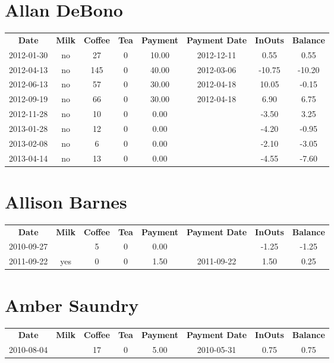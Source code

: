 \section{Allan DeBono}

\begin{center}
\begin{tabular}{cccccccc}
\textbf{Date} & \textbf{Milk} & \textbf{Coffee} & \textbf{Tea} & \textbf{Payment} & \textbf{Payment Date} & \textbf{InOuts} & \textbf{Balance} \\
2012-01-30 & no &  27 & 0 & 10.00 & 2012-12-11 &   0.55 &   0.55\\ 
2012-04-13 & no & 145 & 0 & 40.00 & 2012-03-06 & -10.75 & -10.20\\ 
2012-06-13 & no &  57 & 0 & 30.00 & 2012-04-18 &  10.05 &  -0.15\\ 
2012-09-19 & no &  66 & 0 & 30.00 & 2012-04-18 &   6.90 &   6.75\\ 
2012-11-28 & no &  10 & 0 &  0.00 &  &  -3.50 &   3.25\\ 
2013-01-28 & no &  12 & 0 &  0.00 &  &  -4.20 &  -0.95\\ 
2013-02-08 & no &   6 & 0 &  0.00 &  &  -2.10 &  -3.05\\ 
2013-04-14 & no &  13 & 0 &  0.00 &  &  -4.55 &  -7.60
\end{tabular}
\end{center}

\section{Allison Barnes}

\begin{center}
\begin{tabular}{cccccccc}
\textbf{Date} & \textbf{Milk} & \textbf{Coffee} & \textbf{Tea} & \textbf{Payment} & \textbf{Payment Date} & \textbf{InOuts} & \textbf{Balance} \\
2010-09-27 &  & 5 & 0 & 0.00 &  & -1.25 & -1.25\\ 
2011-09-22 & yes & 0 & 0 & 1.50 & 2011-09-22 &  1.50 &  0.25
\end{tabular}
\end{center}

\section{Amber Saundry}

\begin{center}
\begin{tabular}{cccccccc}
\textbf{Date} & \textbf{Milk} & \textbf{Coffee} & \textbf{Tea} & \textbf{Payment} & \textbf{Payment Date} & \textbf{InOuts} & \textbf{Balance} \\
2010-08-04 &  & 17 & 0 & 5.00 & 2010-05-31 & 0.75 & 0.75
\end{tabular}
\end{center}

